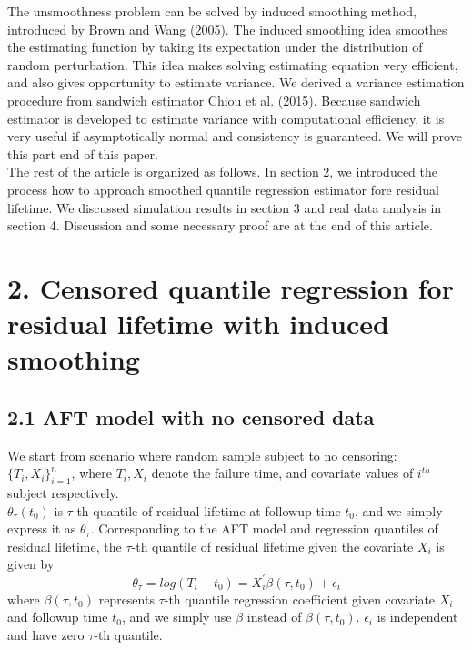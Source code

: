 \documentclass[12pt]{article}
\begin{document}
	The unsmoothness problem can be solved by induced smoothing method, introduced by Brown and Wang (2005). The induced smoothing idea smoothes the estimating function by taking its expectation under the distribution of random perturbation. This idea makes solving estimating equation very efficient, and also gives opportunity to estimate variance. We derived a variance estimation procedure from sandwich estimator Chiou et al. (2015). Because sandwich estimator is developed to estimate variance with computational efficiency, it is very useful if asymptotically normal and consistency is guaranteed. We will prove this part end of this paper.\\
	
	The rest of the article is organized as follows. In section 2, we introduced the process how to approach smoothed quantile regression estimator fore residual lifetime. We discussed simulation results in section 3 and real data analysis in section 4. Discussion and some necessary proof are at the end of this article.
	
\section{2. Censored quantile regression for residual lifetime with induced smoothing}
\subsection{2.1 AFT model with no censored data}
	We start from scenario where random sample subject to no censoring: $\{T_i, X_i\}_{i=1}^{n}$, where $T_i, X_i$ denote the failure time, and covariate values of $i^{th}$ subject respectively.\\
		
	\noindent $\theta_{\tau}(t_0)$ is $\tau$-th quantile of residual lifetime at followup time $t_0$, and we simply express it as $\theta_{\tau}$. Corresponding to the AFT model and regression quantiles of residual lifetime, the $\tau$-th quantile of residual lifetime given the covariate $X_i$ is given by
	\begin{equation} \label{eq:1}
	\theta_{\tau}=log(T_i-t_0)=X_{i}^{\prime}\beta(\tau, t_0)+\epsilon_i
	\end{equation}
	where $\beta(\tau, t_0)$ represents $\tau$-th quantile regression coefficient given covariate $X_i$ and followup time $t_0$, and we simply use $\beta$ instead of $\beta(\tau, t_0)$. $\epsilon_i$ is independent and have zero $\tau$-th quantile.\\
	
\end{document}
